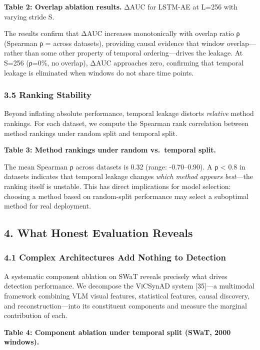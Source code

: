 \documentclass[
]{article}
\begin{document}
\textbf{Table 2: Overlap ablation results.} ΔAUC for LSTM-AE at L=256
with varying stride S.

The results confirm that ΔAUC increases monotonically with overlap ratio
ρ (Spearman ρ = across datasets), providing causal evidence that window
overlap---rather than some other property of temporal ordering---drives
the leakage. At S=256 (ρ=0\%, no overlap), ΔAUC approaches zero,
confirming that temporal leakage is eliminated when windows do not share
time points.

\subsubsection{3.5 Ranking Stability}\label{ranking-stability}

Beyond inflating absolute performance, temporal leakage distorts
\emph{relative} method rankings. For each dataset, we compute the
Spearman rank correlation between method rankings under random split and
temporal split.

\textbf{Table 3: Method rankings under random vs.~temporal split.}

The mean Spearman ρ across datasets is 0.32 (range: -0.70--0.90). A ρ
\textless{} 0.8 in datasets indicates that temporal leakage changes
\emph{which method appears best}---the ranking itself is unstable. This
has direct implications for model selection: choosing a method based on
random-split performance may select a suboptimal method for real
deployment.

\subsection{4. What Honest Evaluation
Reveals}\label{what-honest-evaluation-reveals}

\subsubsection{4.1 Complex Architectures Add Nothing to
Detection}\label{complex-architectures-add-nothing-to-detection}

A systematic component ablation on SWaT reveals precisely what drives
detection performance. We decompose the ViCSynAD system {[}35{]}---a
multimodal framework combining VLM visual features, statistical
features, causal discovery, and reconstruction---into its constituent
components and measure the marginal contribution of each.

\textbf{Table 4: Component ablation under temporal split (SWaT, 2000
windows).}
\end{document}
